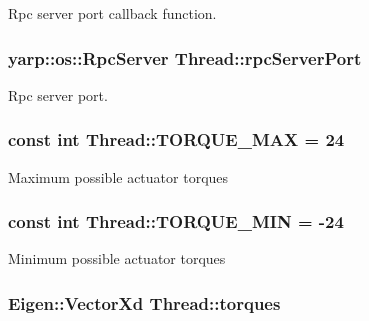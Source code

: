 \-Rpc server port callback function. \hypertarget{classThread_adbec1b4f2c8fc40641df6f118e93fd25}{
\subsubsection[{rpc\-Server\-Port}]{\setlength{\rightskip}{0pt plus 5cm}yarp\-::os\-::\-Rpc\-Server {\bf \-Thread\-::rpc\-Server\-Port}}}\label{classThread_adbec1b4f2c8fc40641df6f118e93fd25}
\-Rpc server port. \hypertarget{classThread_a5e864394c4bd0fbdf3cba7f6f825e17d}{
\subsubsection[{\-T\-O\-R\-Q\-U\-E\-\_\-\-M\-A\-X}]{\setlength{\rightskip}{0pt plus 5cm}const int {\bf \-Thread\-::\-T\-O\-R\-Q\-U\-E\-\_\-\-M\-A\-X} = 24}}\label{classThread_a5e864394c4bd0fbdf3cba7f6f825e17d}
\-Maximum possible actuator torques \hypertarget{classThread_ad44e5fbda8070c252ea71823a4b9a6db}{
\subsubsection[{\-T\-O\-R\-Q\-U\-E\-\_\-\-M\-I\-N}]{\setlength{\rightskip}{0pt plus 5cm}const int {\bf \-Thread\-::\-T\-O\-R\-Q\-U\-E\-\_\-\-M\-I\-N} = -\/24}}\label{classThread_ad44e5fbda8070c252ea71823a4b9a6db}
\-Minimum possible actuator torques \hypertarget{classThread_a3238993799b36af06f3858a3f65dcf1e}{
\subsubsection[{torques}]{\setlength{\rightskip}{0pt plus 5cm}\-Eigen\-::\-Vector\-Xd {\bf \-Thread\-::torques}}}\label{classThread_a3238993799b36af06f3858a3f65dcf1e}
